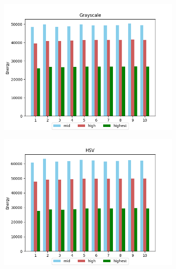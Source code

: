 \begin{figure}[H]
    \caption{\label{fig:appendix_coin_v_fft_results}Coin "v" letter FFT approach for (a) Grayscale, (b) HSV and (c) LAB images.}
    \centering
    \begin{subfigure}{.5\textwidth}
        \centering
        \includegraphics[scale=0.41]{images/appendix/fft/coin_v/grayscale.png}
        \caption{}
    \end{subfigure}%
    \begin{subfigure}{.5\textwidth}
         \centering
          \includegraphics[scale=0.41]{images/appendix/fft/coin_v/hsv.png}
          \caption{}
    \end{subfigure}
    \fautor
\end{figure}
